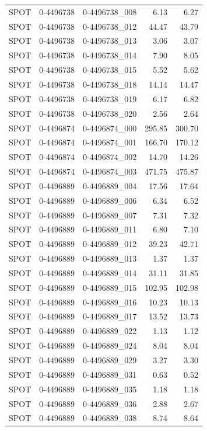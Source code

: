 \begin{tabular}{lllrr}
SPOT & 0-4496738 & 0-4496738_008 & 6.13 & 6.27 \\
SPOT & 0-4496738 & 0-4496738_012 & 44.47 & 43.79 \\
SPOT & 0-4496738 & 0-4496738_013 & 3.06 & 3.07 \\
SPOT & 0-4496738 & 0-4496738_014 & 7.90 & 8.05 \\
SPOT & 0-4496738 & 0-4496738_015 & 5.52 & 5.62 \\
SPOT & 0-4496738 & 0-4496738_018 & 14.14 & 14.47 \\
SPOT & 0-4496738 & 0-4496738_019 & 6.17 & 6.82 \\
SPOT & 0-4496738 & 0-4496738_020 & 2.56 & 2.64 \\
SPOT & 0-4496874 & 0-4496874_000 & 295.85 & 300.70 \\
SPOT & 0-4496874 & 0-4496874_001 & 166.70 & 170.12 \\
SPOT & 0-4496874 & 0-4496874_002 & 14.70 & 14.26 \\
SPOT & 0-4496874 & 0-4496874_003 & 471.75 & 475.87 \\
SPOT & 0-4496889 & 0-4496889_004 & 17.56 & 17.64 \\
SPOT & 0-4496889 & 0-4496889_006 & 6.34 & 6.52 \\
SPOT & 0-4496889 & 0-4496889_007 & 7.31 & 7.32 \\
SPOT & 0-4496889 & 0-4496889_011 & 6.80 & 7.10 \\
SPOT & 0-4496889 & 0-4496889_012 & 39.23 & 42.71 \\
SPOT & 0-4496889 & 0-4496889_013 & 1.37 & 1.37 \\
SPOT & 0-4496889 & 0-4496889_014 & 31.11 & 31.85 \\
SPOT & 0-4496889 & 0-4496889_015 & 102.95 & 102.98 \\
SPOT & 0-4496889 & 0-4496889_016 & 10.23 & 10.13 \\
SPOT & 0-4496889 & 0-4496889_017 & 13.52 & 13.73 \\
SPOT & 0-4496889 & 0-4496889_022 & 1.13 & 1.12 \\
SPOT & 0-4496889 & 0-4496889_024 & 8.04 & 8.04 \\
SPOT & 0-4496889 & 0-4496889_029 & 3.27 & 3.30 \\
SPOT & 0-4496889 & 0-4496889_031 & 0.63 & 0.52 \\
SPOT & 0-4496889 & 0-4496889_035 & 1.18 & 1.18 \\
SPOT & 0-4496889 & 0-4496889_036 & 2.88 & 2.67 \\
SPOT & 0-4496889 & 0-4496889_038 & 8.74 & 8.64 \\

\end{tabular}
